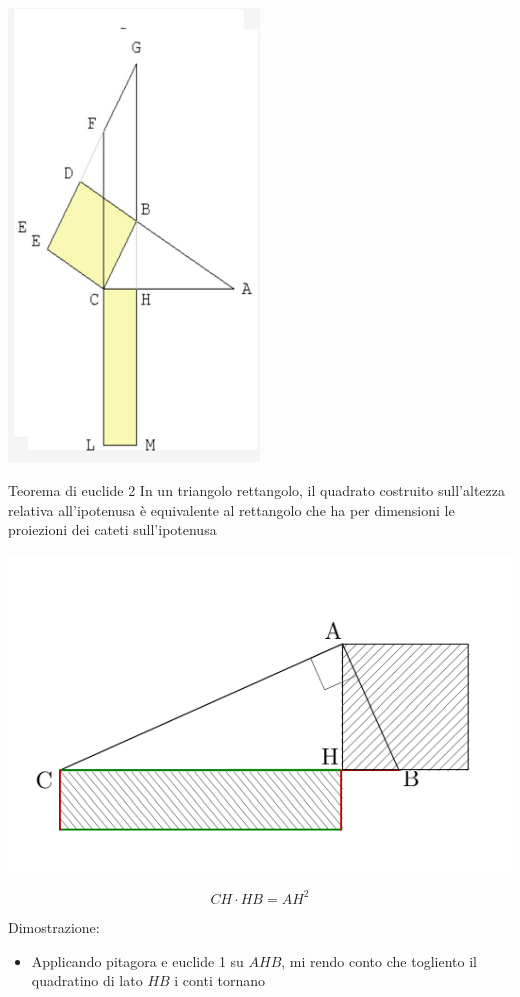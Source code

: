 \begin{center}
	\includegraphics[width = 0.5\textwidth]{Images/Euclide 1 dimostrazione.png}
\end{center}

\begin{teorema}{Teorema di euclide 2}
	In un triangolo rettangolo, il quadrato costruito sull’altezza relativa all’ipotenusa è equivalente al rettangolo che ha per dimensioni le proiezioni dei cateti sull’ipotenusa
	\begin{center}
		\includegraphics{Images/Euclide 2.pdf }
	\end{center}
	\[
		CH \cdot HB = AH ^2
	\]
	\vskip3mm
\end{teorema}
Dimostrazione:
\begin{itemize}
	\item Applicando pitagora e euclide 1 su $ AHB $, mi rendo conto che togliento il quadratino di lato $ HB $ i conti tornano
\end{itemize}





